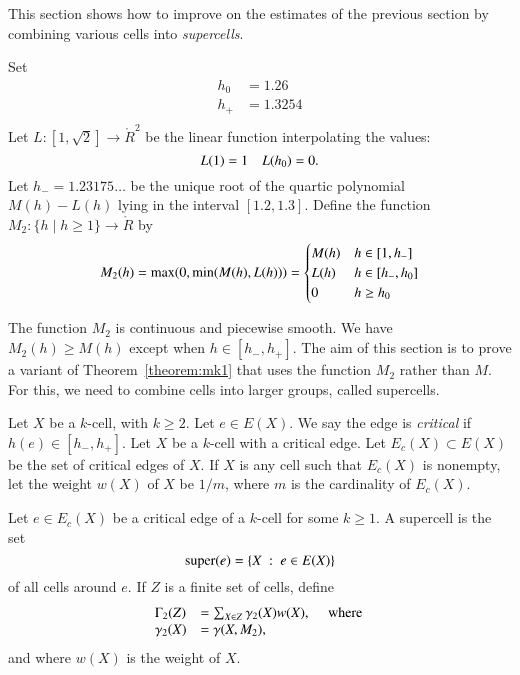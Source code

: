 This section shows how to improve on the estimates of the previous section
by combining various cells into {\it supercells}.

\begin{definition}
Set
$$
\begin{array}{lll}
  h_0  &= 1.26\\  %
  h_+  &= 1.3254\\
\end{array}
$$
Let $L:[1,\sqrt{2}]\to\ring{R}^2$ be the linear function interpolating the
values:
$$
L(1) = 1\quad L({h_0}) = 0.
$$
Let $h_- = 1.23175\ldots$ be the unique root of the quartic polynomial
$M(h)-L(h)$ lying in the interval $[1.2,1.3]$.
Define the function $M_2:\{h\mid h\ge 1\}\to\ring{R}$ by
$$
M_2(h) = \max(0,\min(M(h),L(h))) = 
\begin{cases}
  M(h) & h \in [1,h_-]\\
  L(h) & h \in [h_-,{h_0}]\\
  0 & h \ge {h_0}\\
\end{cases}
$$
\end{definition}

The function $M_2$ is continuous and piecewise smooth.  We have
$M_2(h)\ge M(h)$ except when $h\in [h_-,h_+]$.  The aim of this section is to prove a variant of Theorem~\ref{theorem:mk1} that uses the function $M_2$ rather than $M$.  For this, we need to combine cells into larger groups, called supercells.

\begin{definition}
Let $X$ be a $k$-cell, with $k\ge 2$.  Let $e\in E(X)$.
We say the edge is {\it critical} if $h(e)\in[h_-,h_+]$.
Let $X$ be a $k$-cell with a critical edge.  Let $E_c(X)\subset E(X)$
be the set of critical edges of $X$.  If $X$ is any cell such that
$E_c(X)$ is nonempty, let the weight $w(X)$ of $X$  
be $1/m$, where
$m$ is the cardinality of $E_c(X)$.
\end{definition}

\begin{definition}
Let $e\in E_c(X)$ be a critical edge of a $k$-cell for some $k\ge 1$.
A supercell is the set 
$$
{\operatorname{super}}(e) = \{X\ :\  e\in E(X)\} 
$$
of all cells around $e$. If $Z$ is a finite set of cells, define
$$
\begin{array}{lll}
\Gamma_2(Z) &= \sum_{X\in Z} \gamma_2(X) w(X),\quad\hbox{ where }\\
\gamma_2(X) &= \gamma(X,M_2),
\end{array}
$$
and where $w(X)$ is the weight of $X$.

\end{definition}

